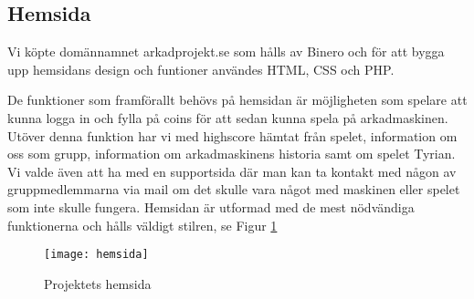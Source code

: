 \documentclass[12pt,fleqn,openany]{book} %
\begin{document}

\begin{table}[!h]
\centering\caption{Förklaring av databastabell}
\label{table_databas}
\end{table}

\subsection{Hemsida}

Vi köpte domännamnet arkadprojekt.se som hålls av Binero och för att bygga upp hemsidans design och funtioner användes HTML, CSS och PHP.

De funktioner som framförallt behövs på hemsidan är möjligheten som spelare att kunna logga in och fylla på coins för att sedan kunna spela 
på arkadmaskinen. Utöver denna funktion har vi med highscore hämtat från spelet, information om oss som grupp, information om arkadmaskinens 
historia samt om spelet Tyrian. Vi valde även att ha med en supportsida där man kan ta kontakt med någon av gruppmedlemmarna via mail om det 
skulle vara något med maskinen eller spelet som inte skulle fungera. Hemsidan är utformad med de mest nödvändiga funktionerna och hålls väldigt stilren, se Figur \ref{fig_hemsida}
\begin{figure}[h]
\centering\texttt{[image: hemsida]}
\caption{Projektets hemsida}
\label{fig_hemsida}
\end{figure}
\end{document}
